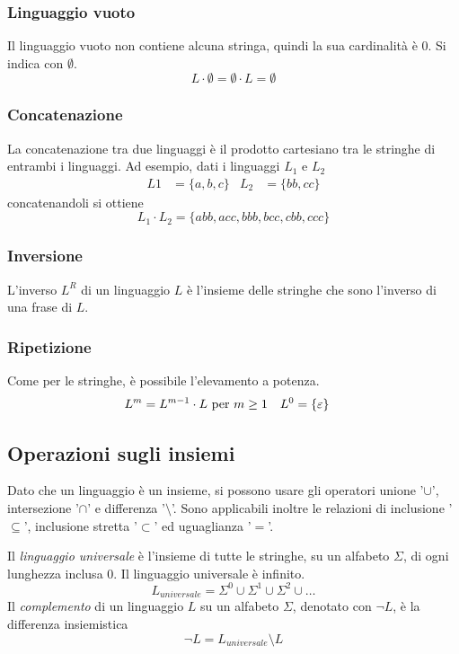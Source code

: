 \documentclass[11pt]{article}
\begin{document}
\subsubsection*{Linguaggio vuoto}
Il linguaggio vuoto non contiene alcuna stringa, quindi la sua cardinalità è 0. Si indica con $\emptyset$.
\begin{equation*}
    L\cdot \emptyset=\emptyset\cdot L = \emptyset
\end{equation*}
\subsubsection*{Concatenazione}
La concatenazione tra due linguaggi è il prodotto cartesiano tra le stringhe di entrambi i linguaggi. Ad esempio, dati
i linguaggi $L_1$ e $L_2$
\begin{align*}
    L1&=\{a,b,c\} & L_2&=\{bb,cc\}
\end{align*}
concatenandoli si ottiene
\begin{equation*}
    L_1\cdot L_2=\{abb,acc,bbb,bcc,cbb,ccc\}
\end{equation*}
\subsubsection*{Inversione}
L'inverso $L^R$ di un linguaggio $L$ è l'insieme delle stringhe che sono l'inverso di una frase di $L$.
\subsubsection*{Ripetizione}
Come per le stringhe, è possibile l'elevamento a potenza.
\begin{align*}
    L^m&=L^{m-1}\cdot L \textnormal{ per } m\geq 1 & L^0&=\{\varepsilon\}
\end{align*}
\subsection{Operazioni sugli insiemi}
Dato che un linguaggio è un insieme, si possono usare gli operatori unione '$\cup$', intersezione '$\cap$' e differenza 
'$\setminus$'. Sono applicabili inoltre le relazioni di inclusione '$\subseteq$', inclusione stretta '$\subset$' ed 
uguaglianza '$=$'.

Il \textit{linguaggio universale} è l'insieme di tutte le stringhe, su un alfabeto $\Sigma$, di ogni lunghezza inclusa 0.
Il linguaggio universale è infinito.
\begin{equation*}
    L_{universale}=\Sigma^0 \cup \Sigma^1 \cup \Sigma^2 \cup \dots
\end{equation*}
Il \textit{complemento} di un linguaggio $L$ su un alfabeto $\Sigma$, denotato con $\lnot L$, è la differenza insiemistica
\begin{equation*}
    \lnot L=L_{universale}\setminus L
\end{equation*}
\end{document}
